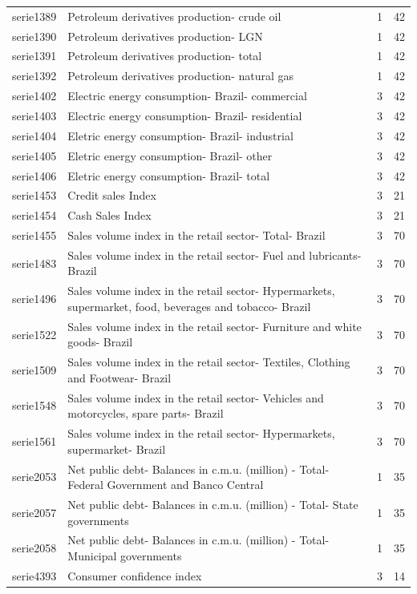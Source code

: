 \documentclass{article}
\begin{document}
{\begin{landscape}
\begin{center}
\begin{longtable}{|l|l|l|l|}
serie1389 & Petroleum derivatives production- crude oil & 1 & 42 \\
serie1390 & Petroleum derivatives production- LGN & 1 & 42 \\
serie1391 & Petroleum derivatives production- total & 1 & 42 \\
serie1392 & Petroleum derivatives production- natural gas & 1 & 42 \\
serie1402 & Electric energy consumption- Brazil- commercial & 3 & 42 \\
serie1403 & Electric energy consumption- Brazil- residential & 3 & 42 \\
serie1404 & Eletric energy consumption- Brazil- industrial & 3 & 42 \\
serie1405 & Eletric energy consumption- Brazil- other & 3 & 42 \\
serie1406 & Eletric energy consumption- Brazil- total & 3 & 42 \\
serie1453 & Credit sales Index & 3 & 21 \\
serie1454 & Cash Sales Index & 3 & 21 \\
serie1455 & Sales volume index in the retail sector- Total- Brazil & 3 & 70 \\
serie1483 & Sales volume index in the retail sector- Fuel and lubricants- Brazil & 3 & 70 \\
serie1496 & Sales volume index in the retail sector- Hypermarkets, supermarket, food, beverages and tobacco- Brazil & 3 & 70 \\
serie1522 & Sales volume index in the retail sector- Furniture and white goods- Brazil & 3 & 70 \\
serie1509 & Sales volume index in the retail sector- Textiles, Clothing and Footwear- Brazil & 3 & 70 \\
serie1548 & Sales volume index in the retail sector- Vehicles and motorcycles, spare parts- Brazil & 3 & 70 \\
serie1561 & Sales volume index in the retail sector- Hypermarkets, supermarket- Brazil & 3 & 70 \\
serie2053 & Net public debt- Balances in c.m.u. (million) - Total- Federal Government and Banco Central & 1 & 35 \\
serie2057 & Net public debt- Balances in c.m.u. (million) - Total- State governments & 1 & 35 \\
serie2058 & Net public debt- Balances in c.m.u. (million) - Total- Municipal governments & 1 & 35 \\
serie4393 & Consumer confidence index & 3 & 14 \\

\end{longtable}
\end{center}
\end{landscape}}
\end{document}

